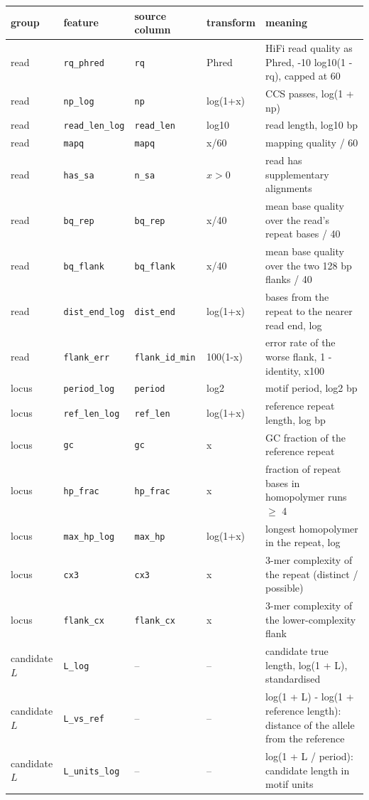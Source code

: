 \begin{tabularx}{\textwidth}{@{}l l l l L@{}}
\toprule
group & feature & source column & transform & meaning \\
\midrule
read & \texttt{rq\_phred} & \texttt{rq} & Phred & HiFi read quality as Phred, -10 log10(1 - rq), capped at 60 \\
read & \texttt{np\_log} & \texttt{np} & log(1+x) & CCS passes, log(1 + np) \\
read & \texttt{read\_len\_log} & \texttt{read\_len} & log10 & read length, log10 bp \\
read & \texttt{mapq} & \texttt{mapq} & x/60 & mapping quality / 60 \\
read & \texttt{has\_sa} & \texttt{n\_sa} & $x>0$ & read has supplementary alignments \\
read & \texttt{bq\_rep} & \texttt{bq\_rep} & x/40 & mean base quality over the read's repeat bases / 40 \\
read & \texttt{bq\_flank} & \texttt{bq\_flank} & x/40 & mean base quality over the two 128 bp flanks / 40 \\
read & \texttt{dist\_end\_log} & \texttt{dist\_end} & log(1+x) & bases from the repeat to the nearer read end, log \\
read & \texttt{flank\_err} & \texttt{flank\_id\_min} & 100(1-x) & error rate of the worse flank, 1 - identity, x100 \\
locus & \texttt{period\_log} & \texttt{period} & log2 & motif period, log2 bp \\
locus & \texttt{ref\_len\_log} & \texttt{ref\_len} & log(1+x) & reference repeat length, log bp \\
locus & \texttt{gc} & \texttt{gc} & x & GC fraction of the reference repeat \\
locus & \texttt{hp\_frac} & \texttt{hp\_frac} & x & fraction of repeat bases in homopolymer runs $\geq$ 4 \\
locus & \texttt{max\_hp\_log} & \texttt{max\_hp} & log(1+x) & longest homopolymer in the repeat, log \\
locus & \texttt{cx3} & \texttt{cx3} & x & 3-mer complexity of the repeat (distinct / possible) \\
locus & \texttt{flank\_cx} & \texttt{flank\_cx} & x & 3-mer complexity of the lower-complexity flank \\
candidate $L$ & \texttt{L\_log} & -- & -- & candidate true length, log(1 + L), standardised \\
candidate $L$ & \texttt{L\_vs\_ref} & -- & -- & log(1 + L) - log(1 + reference length): distance of the allele from the reference \\
candidate $L$ & \texttt{L\_units\_log} & -- & -- & log(1 + L / period): candidate length in motif units \\
\bottomrule
\end{tabularx}
